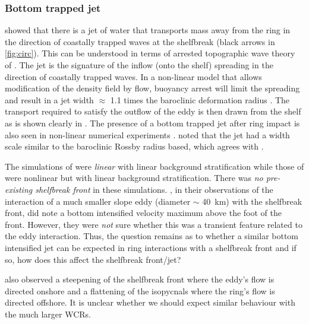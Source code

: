 \subsubsection*{Bottom trapped jet}
\cite{Chapman1987} showed that there is a jet of water that transports mass away from the ring in the direction of coastally trapped waves at the shelfbreak (black arrows in \cref{fig:circ}). This can be understood in terms of arrested topographic wave theory of \cite{Csanady1978}. The jet is the signature of the inflow (onto the shelf) spreading in the direction of coastally trapped waves. In a non-linear model that allows modification of the density field by flow, buoyancy arrest will limit the spreading and result in a jet width $\approx$ 1.1 times the baroclinic deformation radius \citep[baroclinic inflow]{Brink2012}. The transport required to satisfy the outflow of the eddy is then drawn from the shelf as is shown clearly in \cite{Chapman1987}. The presence of a bottom trapped jet after ring impact is also seen in non-linear numerical experiments \citep[e.g.\ ][]{Oey2004,Wei2009}. \cite{Oey2004} noted that the jet had a width scale similar to the baroclinic Rossby radius based, which agrees with \cite{Brink2012}. 
 
The simulations of \cite{Chapman1987,Kelly1988} were \emph{linear} with linear background stratification while those of \cite{Oey2004,Wei2009} were nonlinear but with linear background stratification. There was \emph{no pre-existing shelfbreak front} in these simulations. \cite{Gawarkiewicz2001}, in their observations of the interaction of a much smaller slope eddy (diameter $\sim$ \SI{40}{\km}) with the shelfbreak front, did note a bottom intensified velocity maximum above the foot of the front. However, they were \emph{not} sure whether this was a transient feature related to the eddy interaction. Thus, the question remains as to whether a similar bottom intensified jet can be expected in ring interactions with a shelfbreak front and if so, how does this affect the shelfbreak front/jet?

\cite{Gawarkiewicz2001} also observed a steepening of the shelfbreak front where the eddy’s flow is directed onshore and a flattening of the isopycnals where the ring’s flow is directed offshore. It is unclear whether we should expect similar behaviour with the much larger WCRs.

